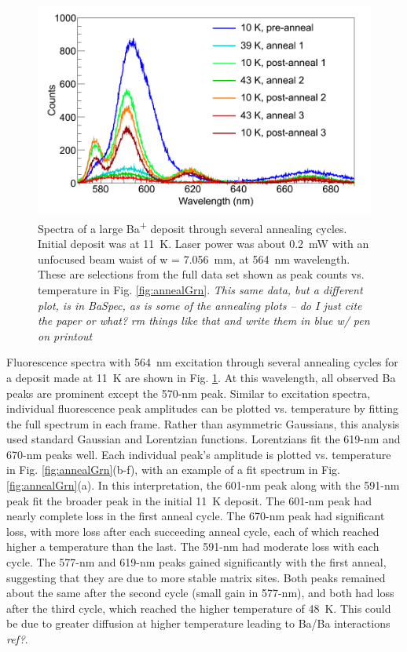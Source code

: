 \begin{figure} %
        \centering
                \includegraphics[width=.95\textwidth]{figures/spectra_annealing.png}
                \caption{Spectra of a large Ba\textsuperscript{+} deposit through several annealing cycles.  Initial deposit was at 11~K.  Laser power was about 0.2~mW with an unfocused beam waist of w = 7.056~mm, at 564~nm wavelength.  These are selections from the full data set shown as peak counts vs. temperature in Fig. \ref{fig:annealGrn}.  \emph{\color{red}This same data, but a different plot, is in BaSpec, as is some of the annealing plots -- do I just cite the paper or what?} \emph{\color{blue}rm things like that and write them in blue w/ pen on printout}}
\label{fig:specAnneal}
\end{figure}

Fluorescence spectra with 564~nm excitation through several annealing cycles for a deposit made at 11~K are shown in Fig. \ref{fig:specAnneal}.  At this wavelength, all observed Ba peaks are prominent except the 570-nm peak.  Similar to excitation spectra, individual fluorescence peak amplitudes can be plotted vs. temperature by fitting the full spectrum in each frame.  Rather than asymmetric Gaussians, this analysis used standard Gaussian and Lorentzian functions.  Lorentzians fit the 619-nm and 670-nm peaks well.  Each individual peak's amplitude is plotted vs. temperature in Fig. \ref{fig:annealGrn}(b-f), with an example of a fit spectrum in Fig. \ref{fig:annealGrn}(a).  In this interpretation, the 601-nm peak along with the 591-nm peak fit the broader peak in the initial 11~K deposit.  The 601-nm peak had nearly complete loss in the first anneal cycle.  The 670-nm peak had significant loss, with more loss after each succeeding anneal cycle, each of which reached higher a temperature than the last.  The 591-nm had moderate loss with each cycle.  The 577-nm and 619-nm peaks gained significantly with the first anneal, suggesting that they are due to more stable matrix sites.  Both peaks remained about the same after the second cycle (small gain in 577-nm), and both had loss after the third cycle, which reached the higher temperature of 48~K. This could be due to greater diffusion at higher temperature leading to Ba/Ba interactions \emph{\color{gray}ref?}.

